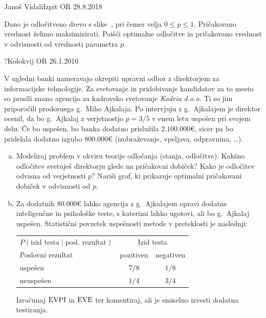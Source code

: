 \begin{naloga}{Janoš Vidali}{Izpit OR 28.8.2018}
\begin{vprasanje}[dectree3]
Dano je odločitveno drevo s slike~\fig{},
pri čemer velja $0 \le p \le 1$.
Pričakovano vred\-nost želimo maksimizirati.
Poišči optimalne odločitve in pričakovano vrednost
v odvisnosti od vrednosti parametra $p$.

\begin{slika}
\pgfslika
{}
\end{slika}
\end{vprasanje}
\begin{odgovor}
\end{odgovor}
\end{naloga}


\begin{naloga}{?}{Kolokvij OR 26.1.2010}
\begin{vprasanje}[ajkalaj]
V ugledni banki nameravajo okrepiti upravni odbor
z direktorjem za informacijske tehnologije.
Za svetovanje in pridobivanje kandidatov za to mesto
so prosili znano agencijo za kadrovsko svetovanje {\em Kadria d.o.o.}
Ti so jim priporočili prodornega g.~Miho Ajkalaja.
Po intervjuju z g.~Ajkalajem je direktor ocenil,
da bo g.~Ajkalaj z verjetnostjo $p = 3/5$ v enem letu uspešen pri svojem delu.
Če bo uspešen, bo banka dodatno prislužila $2.100.000 €$,
sicer pa bo pridelala dodatno izgubo $800.000 €$
(izobraževanje, vpeljava, odpravnina, \dots).

\begin{enumerate}[(a)]
\item Modeliraj problem v okviru teorije odločanja (stanja, odločitve).
Kakšno odločitev svetuješ direktorju glede na pričakovni dobiček?
Kako je odločitev odvisna od verjetnosti $p$?
Nariši graf, ki prikazuje optimalni pričakovani dobiček v odvisnosti od $p$.

\item Za dodatnih $80.000 €$ lahko agencija
z g.~Ajkalajem opravi dodatne inteligenčne in psihološke teste,
s katerimi lahko ugotovi, ali bo g.~Ajkalaj uspešen.
Statistični povzetek uspešnosti metode v preteklosti je naslednji:
\begin{center}
\begin{tabular}{l|cc}
$P(\text{izid testa} \;|\; \text{posl.~rezultat})$ &
\multicolumn{2}{c}{Izid testa} \\
Poslovni rezultat & pozitiven & negativen \\ \hline
uspešen   &  $7/8$ & $1/8$ \\
neuspešen &  $1/4$ & $3/4$
\end{tabular}
\end{center}
Izračunaj $\operatorname{EVPI}$ in $\operatorname{EVE}$ ter komentiraj,
ali je smiselno izvesti dodatna testiranja.


\end{enumerate}
\end{vprasanje}
\end{naloga}
